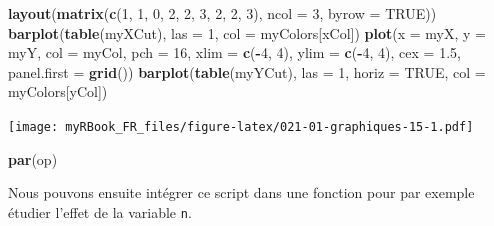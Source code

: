 \documentclass[
]{book}
\newenvironment{Shaded}{\begin{snugshade}}{\end{snugshade}}
\newcommand{\DataTypeTok}[1]{\textcolor[rgb]{0.13,0.29,0.53}{#1}}
\newcommand{\DecValTok}[1]{\textcolor[rgb]{0.00,0.00,0.81}{#1}}
\newcommand{\FloatTok}[1]{\textcolor[rgb]{0.00,0.00,0.81}{#1}}
\newcommand{\KeywordTok}[1]{\textcolor[rgb]{0.13,0.29,0.53}{\textbf{#1}}}
\newcommand{\NormalTok}[1]{#1}
\newcommand{\OperatorTok}[1]{\textcolor[rgb]{0.81,0.36,0.00}{\textbf{#1}}}
\newcommand{\OtherTok}[1]{\textcolor[rgb]{0.56,0.35,0.01}{#1}}
\begin{document}
\begin{Shaded}
\begin{Highlighting}[]
\KeywordTok{layout}\NormalTok{(}\KeywordTok{matrix}\NormalTok{(}\KeywordTok{c}\NormalTok{(}\DecValTok{1}\NormalTok{, }\DecValTok{1}\NormalTok{, }\DecValTok{0}\NormalTok{, }
                \DecValTok{2}\NormalTok{, }\DecValTok{2}\NormalTok{, }\DecValTok{3}\NormalTok{, }
                \DecValTok{2}\NormalTok{, }\DecValTok{2}\NormalTok{, }\DecValTok{3}\NormalTok{), }\DataTypeTok{ncol =} \DecValTok{3}\NormalTok{, }\DataTypeTok{byrow =} \OtherTok{TRUE}\NormalTok{))}
\KeywordTok{barplot}\NormalTok{(}\KeywordTok{table}\NormalTok{(myXCut), }\DataTypeTok{las =} \DecValTok{1}\NormalTok{, }\DataTypeTok{col =}\NormalTok{ myColors[xCol])}
\KeywordTok{plot}\NormalTok{(}\DataTypeTok{x =}\NormalTok{ myX, }\DataTypeTok{y =}\NormalTok{ myY, }\DataTypeTok{col =}\NormalTok{ myCol, }\DataTypeTok{pch =} \DecValTok{16}\NormalTok{, }
  \DataTypeTok{xlim =} \KeywordTok{c}\NormalTok{(}\OperatorTok{-}\DecValTok{4}\NormalTok{, }\DecValTok{4}\NormalTok{), }\DataTypeTok{ylim =} \KeywordTok{c}\NormalTok{(}\OperatorTok{-}\DecValTok{4}\NormalTok{, }\DecValTok{4}\NormalTok{), }\DataTypeTok{cex =} \FloatTok{1.5}\NormalTok{, }
  \DataTypeTok{panel.first =} \KeywordTok{grid}\NormalTok{())}
\KeywordTok{barplot}\NormalTok{(}\KeywordTok{table}\NormalTok{(myYCut), }\DataTypeTok{las =} \DecValTok{1}\NormalTok{, }\DataTypeTok{horiz =} \OtherTok{TRUE}\NormalTok{, }\DataTypeTok{col =}\NormalTok{ myColors[yCol])}
\end{Highlighting}
\end{Shaded}

\texttt{[image: myRBook\_FR\_files/figure-latex/021-01-graphiques-15-1.pdf]}

\begin{Shaded}
\begin{Highlighting}[]
\KeywordTok{par}\NormalTok{(op)}
\end{Highlighting}
\end{Shaded}

Nous pouvons ensuite intégrer ce script dans une fonction pour par exemple étudier l'effet de la variable \texttt{n}.
\end{document}
